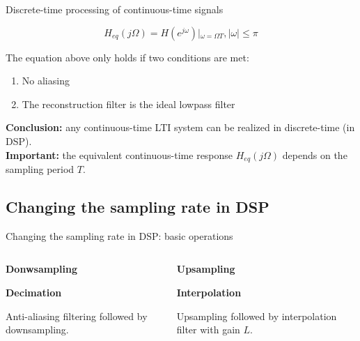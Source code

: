\documentclass[10pt, aspectratio=169]{beamer}
\begin{document}
%
\begin{frame}{Discrete-time processing of continuous-time signals}
\vspace{-0.5cm}
\begin{center}
	\def\Heff{1}
	\resizebox{0.7\linewidth}{!}{}
\end{center}

\begin{equation*}
H_{eq}(j\Omega) = H(e^{j\omega})|_{\omega = \Omega T}, |\omega| \leq \pi
\end{equation*}

The equation above only holds if two conditions are met:
\begin{enumerate}
	\item No aliasing
	\item The reconstruction filter is the ideal lowpass filter
\end{enumerate}
\textbf{Conclusion:} any continuous-time LTI system can be realized in discrete-time (in DSP).\\
\textbf{Important:} the equivalent continuous-time response $H_{eq}(j\Omega)$ depends on the sampling period $T$.
\end{frame}

\subsection{Changing the sampling rate in DSP}
\begin{frame}{Changing the sampling rate in DSP: basic operations}
\begin{columns}[t]
	\begin{column}{0.5\textwidth}
		\textbf{Donwsampling}
		\begin{center}
			\resizebox{!}{0.18\textheight}{}
		\end{center}
		\textbf{Decimation}
		\begin{center}
			\resizebox{!}{0.22\textheight}{}
		\end{center}
		Anti-aliasing filtering followed by downsampling.
	\end{column}
	\begin{column}{0.5\textwidth}
	\textbf{Upsampling}
	\vspace{-0.7cm}
	\begin{center}
		\resizebox{1\textwidth}{!}{}
	\end{center}
	
	\textbf{Interpolation}
	\vspace{0.35cm}
	\begin{center}
	\resizebox{!}{0.15\textheight}{}
	\end{center}
	Upsampling followed by interpolation filter with gain $L$.
	\end{column}
\end{columns}
\end{frame}
\end{document}
